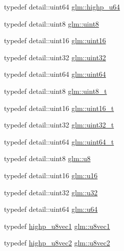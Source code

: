 \begin{DoxyCompactItemize}
\item 
typedef detail\+::uint64 \hyperlink{group__gtc__type__precision_ga6006ea883d3c0491791650b2fb84de39}{glm\+::highp\+\_\+u64}
\item 
typedef detail\+::uint8 \hyperlink{group__gtc__type__precision_ga1a7dcd8aac97cc8020817c94049deff2}{glm\+::uint8}
\item 
typedef detail\+::uint16 \hyperlink{group__gtc__type__precision_gad8c2939e1fdd8e5828b31d95c52255d5}{glm\+::uint16}
\item 
typedef detail\+::uint32 \hyperlink{group__gtc__type__precision_ga202b6a53c105fcb7e531f9b443518451}{glm\+::uint32}
\item 
typedef detail\+::uint64 \hyperlink{group__gtc__type__precision_gae3632bf9b37da66233d78930dd06378a}{glm\+::uint64}
\item 
typedef detail\+::uint8 \hyperlink{group__gtc__type__precision_ga93adf6dd9803408f3e3aaf9dedda352b}{glm\+::uint8\+\_\+t}
\item 
typedef detail\+::uint16 \hyperlink{group__gtc__type__precision_gac4eb4f43cae8129b00086dc234d3b8fc}{glm\+::uint16\+\_\+t}
\item 
typedef detail\+::uint32 \hyperlink{group__gtc__type__precision_ga822ca53a9ad412504532838906276a99}{glm\+::uint32\+\_\+t}
\item 
typedef detail\+::uint64 \hyperlink{group__gtc__type__precision_ga058f57c19e1befdcf12498944bd73e69}{glm\+::uint64\+\_\+t}
\item 
typedef detail\+::uint8 \hyperlink{group__gtc__type__precision_ga5e3dc67373d5068997d2d9f41c9024d2}{glm\+::u8}
\item 
typedef detail\+::uint16 \hyperlink{group__gtc__type__precision_gae7a1571503f83d2264ddfa705a6b082a}{glm\+::u16}
\item 
typedef detail\+::uint32 \hyperlink{group__gtc__type__precision_ga54e837745059fd29017bed71cfa0a8db}{glm\+::u32}
\item 
typedef detail\+::uint64 \hyperlink{group__gtc__type__precision_ga71cedd4972f9cb1a5e14dfe5ab83ecd7}{glm\+::u64}
\item 
typedef \hyperlink{fwd_8hpp_aec8648cdcf1bacd47205d172240be623}{highp\+\_\+u8vec1} \hyperlink{group__gtc__type__precision_ga024be724ff45865952190522b03fc0d5}{glm\+::u8vec1}
\item 
typedef \hyperlink{fwd_8hpp_a38a7141fa9ddd5fb59abd032d870525a}{highp\+\_\+u8vec2} \hyperlink{group__gtc__type__precision_ga1c259b876f8757eb197b83a5fab476f0}{glm\+::u8vec2}
\item 

\end{DoxyCompactItemize}
